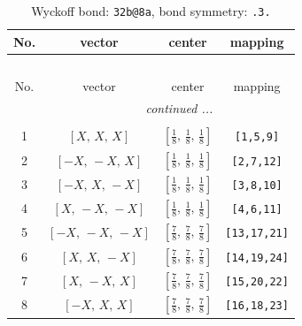 \documentclass[fleqn,8pt]{jsarticle}
\begin{document}
\renewcommand{\arraystretch}{1.2}
\begin{longtable}{cccc}
\caption{Wyckoff bond: {\tt 32b@8a}, bond symmetry: {\tt .3.}}
 \\
 \hline \hline
No. & vector & center & mapping \\ \hline \endfirsthead

\multicolumn{3}{l}{\tablename\ \thetable{}} \\
 \hline \hline
No. & vector & center & mapping \\ \hline \endhead

 \hline \hline
\multicolumn{3}{r}{\footnotesize\it continued ...} \\ \endfoot

 \hline \hline
\multicolumn{3}{r}{} \\ \endlastfoot

1 & $\left[ X,\, X,\, X \right]$ & $\left[ \frac{1}{8},\, \frac{1}{8},\, \frac{1}{8} \right]$ & {\tt [1,5,9]} \\ \hline
2 & $\left[ - X,\, - X,\, X \right]$ & $\left[ \frac{1}{8},\, \frac{1}{8},\, \frac{1}{8} \right]$ & {\tt [2,7,12]} \\ \hline
3 & $\left[ - X,\, X,\, - X \right]$ & $\left[ \frac{1}{8},\, \frac{1}{8},\, \frac{1}{8} \right]$ & {\tt [3,8,10]} \\ \hline
4 & $\left[ X,\, - X,\, - X \right]$ & $\left[ \frac{1}{8},\, \frac{1}{8},\, \frac{1}{8} \right]$ & {\tt [4,6,11]} \\ \hline
5 & $\left[ - X,\, - X,\, - X \right]$ & $\left[ \frac{7}{8},\, \frac{7}{8},\, \frac{7}{8} \right]$ & {\tt [13,17,21]} \\ \hline
6 & $\left[ X,\, X,\, - X \right]$ & $\left[ \frac{7}{8},\, \frac{7}{8},\, \frac{7}{8} \right]$ & {\tt [14,19,24]} \\ \hline
7 & $\left[ X,\, - X,\, X \right]$ & $\left[ \frac{7}{8},\, \frac{7}{8},\, \frac{7}{8} \right]$ & {\tt [15,20,22]} \\ \hline
8 & $\left[ - X,\, X,\, X \right]$ & $\left[ \frac{7}{8},\, \frac{7}{8},\, \frac{7}{8} \right]$ & {\tt [16,18,23]} \\
\end{longtable}
\renewcommand{\arraystretch}{1.2}
\end{document}
